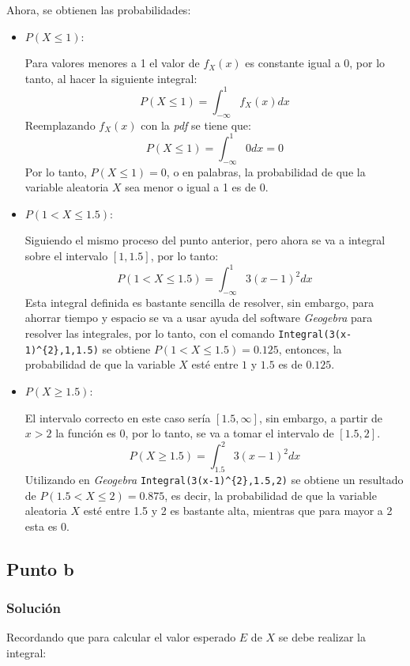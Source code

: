 \documentclass[12pt]{article}
\begin{document}
Ahora, se obtienen las probabilidades:

\begin{itemize}
  \item $P(X \leq 1):$

        Para valores menores a 1 el valor de $f_{X}(x)$ es constante igual a 0, por lo tanto, al hacer la siguiente integral:
        \[
        P(X\leq 1) = \int_{-\infty}^{1} f_{X}(x) dx
        \]
        Reemplazando $f_{X}(x)$ con la \textit{pdf} se tiene que:
        \[  
        P(X\leq 1) = \int_{-\infty}^{1} 0 dx = 0
        \]
        Por lo tanto, $P(X\leq 1) = 0 $, o en palabras, la probabilidad de que la variable aleatoria $X$ sea menor o igual a 1 es de 0.
  \item $P(1 < X \leq 1.5):$

        Siguiendo el mismo proceso del punto anterior, pero ahora se va a integral sobre el intervalo $[1, 1.5]$, por lo tanto:
        \[
        P(1 < X \leq 1.5) = \int_{-\infty}^{1} 3(x-1)^{2} dx
        \]
        Esta integral definida es bastante sencilla de resolver, sin embargo, para ahorrar tiempo y espacio se va a usar ayuda del software \textit{Geogebra} para resolver las integrales, por lo tanto, con el comando \lstinline|Integral(3(x-1)^{2},1,1.5)| se obtiene $P(1 < X \leq 1.5) = 0.125$, entonces, la probabilidad de que la variable $X$ esté entre $1$ y $1.5$ es de $0.125$.
  \item $P(X \geq 1.5):$

        El intervalo correcto en este caso sería $[1.5, \infty]$, sin embargo, a partir de $x > 2$ la función es 0, por lo tanto, se va a tomar el intervalo de $[1.5, 2]$.
        \[
        P(X \geq 1.5) = \int_{1.5}^{2} 3(x-1)^{2} dx
        \]
        Utilizando en \textit{Geogebra} \lstinline|Integral(3(x-1)^{2},1.5,2)| se obtiene un resultado de $P(1.5 < X \leq 2) = 0.875$, es decir, la probabilidad de que la variable aleatoria $X$ esté entre 1.5 y 2 es bastante alta, mientras que para mayor a 2 esta es 0.
\end{itemize}



\subsection{Punto b}
\subsubsection{Solución}

Recordando que para calcular el valor esperado $E$ de $X$ se debe realizar la integral:
\end{document}
